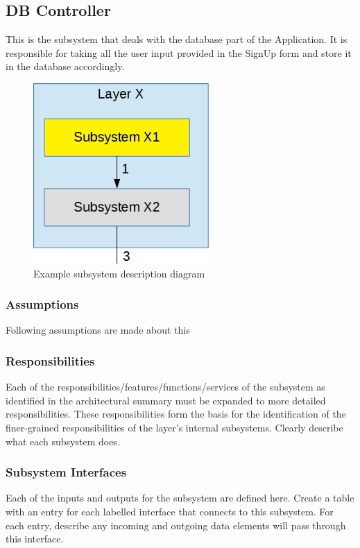 \subsection{DB Controller}
This is the subsystem that deals with the database part of the Application. It is responsible for taking all the user input provided in the SignUp form and store it in the database accordingly.

\begin{figure}[h!]
	\centering
 	\includegraphics[width=0.60\textwidth]{images/subsystem}
 \caption{Example subsystem description diagram}
\end{figure}

\subsubsection{Assumptions}
Following assumptions are made about this 

\subsubsection{Responsibilities}
Each of the responsibilities/features/functions/services of the subsystem as identified in the architectural summary must be expanded to more detailed responsibilities. These responsibilities form the basis for the identification of the finer-grained responsibilities of the layer's internal subsystems. Clearly describe what each subsystem does.

\subsubsection{Subsystem Interfaces}
Each of the inputs and outputs for the subsystem are defined here. Create a table with an entry for each labelled interface that connects to this subsystem. For each entry, describe any incoming and outgoing data elements will pass through this interface.

